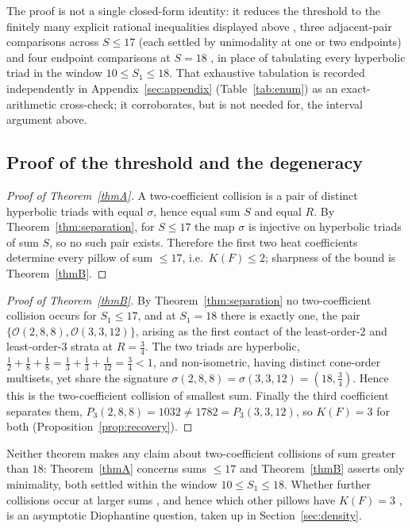 \documentclass[12pt, letterpaper]{article}
\theoremstyle{definition}
\theoremstyle{plain}
\begin{document}
The proof is not a single closed-form identity: it reduces the threshold to the finitely many explicit rational inequalities displayed above ,  three adjacent-pair comparisons across $S\le17$ (each settled by unimodality at one or two endpoints) and four endpoint comparisons at $S=18$ ,  in place of tabulating every hyperbolic triad in the window $10\le S_1\le18$. That exhaustive tabulation is recorded independently in Appendix~\ref{sec:appendix} (Table~\ref{tab:enum}) as an exact-arithmetic cross-check; it corroborates, but is not needed for, the interval argument above.

\subsection{Proof of the threshold and the degeneracy}

\begin{proof}[Proof of Theorem~\ref{thmA}]
A two-coefficient collision is a pair of distinct hyperbolic triads with equal $\sigma$, hence equal sum $S$ and equal $R$. By Theorem~\ref{thm:separation}, for $S\le17$ the map $\sigma$ is injective on hyperbolic triads of sum $S$, so no such pair exists. Therefore the first two heat coefficients determine every pillow of sum $\le17$, i.e.\ $K(F)\le2$; sharpness of the bound is Theorem~\ref{thmB}.
\end{proof}

\begin{proof}[Proof of Theorem~\ref{thmB}]
By Theorem~\ref{thm:separation} no two-coefficient collision occurs for $S_1\le17$, and at $S_1=18$ there is exactly one, the pair $\{\mathcal{O}(2,8,8),\mathcal{O}(3,3,12)\}$, arising as the first contact of the least-order-$2$ and least-order-$3$ strata at $R=\tfrac34$. The two triads are hyperbolic, $\tfrac12+\tfrac18+\tfrac18=\tfrac13+\tfrac13+\tfrac1{12}=\tfrac34<1$, and non-isometric, having distinct cone-order multisets, yet share the signature $\sigma(2,8,8)=\sigma(3,3,12)=(18,\tfrac34)$. Hence this is the two-coefficient collision of smallest sum. Finally the third coefficient separates them, $P_3(2,8,8)=1032\ne1782=P_3(3,3,12)$, so $K(F)=3$ for both (Proposition~\ref{prop:recovery}).
\end{proof}

Neither theorem makes any claim about two-coefficient collisions of sum greater than $18$: Theorem~\ref{thmA} concerns sums $\le17$ and Theorem~\ref{thmB} asserts only minimality, both settled within the window $10\le S_1\le18$. Whether further collisions occur at larger sums ,  and hence which other pillows have $K(F)=3$ ,  is an asymptotic Diophantine question, taken up in Section~\ref{sec:density}.
\end{document}
